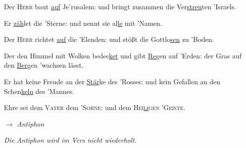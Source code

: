 \begin{multicols}{2}\setlength{\columnseprule}{0.2pt}
Der \textsc{Herr} baut \underline{auf} Je'rusalem: \grestar{} und bringt
zusammen die Ver\underline{streu}ten 'Israels.\par
 Er \underline{zäh}let die 'Sterne: \grestar{} und nennt sie al\underline{le}
mit 'Namen.\par
 Der \textsc{Herr} richtet \underline{auf} die 'Elenden: \grestar{} und stößt
die Gottlo\underline{sen} zu 'Boden.\par
 Der den Himmel mit Wolken bedec\underline{ket} \gredagger{} und gibt
\underline{Re}gen auf 'Erden: \grestar{} der Gras auf den \underline{Ber}gen
'wachsen lässt.\par
 Er hat keine Freude an der \underline{Stär}ke des 'Rosses: \grestar{} und kein
Gefallen an den Schen\underline{keln} des 'Mannes.\par
 Ehre sei dem \textsc{Vater}  dem '\textsc{Sohne}: \grestar{} und dem
\textsc{Hei\underline{li}gen 'Geiste.}\par
  \textit{$\rightarrow$ Antiphon}
\end{multicols} \par
{}
\textit{Die Antiphon wird im Vers nicht wiederholt.}\par
{}
